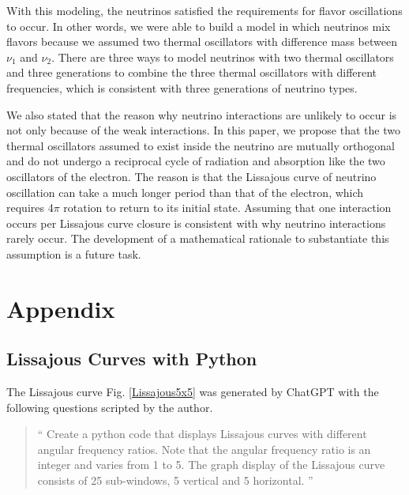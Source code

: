 \documentclass[%
 reprint,
 amsmath,amssymb,
 aps,
]{revtex4-1}
\numberwithin{equation}{section}%
\begin{document}
With this modeling, the neutrinos satisfied the requirements for flavor oscillations to occur. In other words, we were able to build a model in which neutrinos mix flavors because we assumed two thermal oscillators with difference mass between $\nu_1$ and $\nu_2$. There are three ways to model neutrinos with two thermal oscillators and three generations to combine the three thermal oscillators with different frequencies, which is consistent with three generations of neutrino types.


We also stated that the reason why neutrino interactions are unlikely to occur is not only because of the weak interactions. In this paper, we propose that the two thermal oscillators assumed to exist inside the neutrino are mutually orthogonal and do not undergo a reciprocal cycle of radiation and absorption like the two oscillators of the electron. The reason is that the Lissajous curve of neutrino oscillation can take a much longer period than that of the electron, which requires 4$\pi$ rotation to return to its initial state. Assuming that one interaction occurs per Lissajous curve closure is consistent with why neutrino interactions rarely occur. The development of a mathematical rationale to substantiate this assumption is a future task.


\section{Appendix}
\label{Appendix}

\subsection{Lissajous Curves with Python}
\label{}


The Lissajous curve Fig. \ref{Lissajous5x5} was generated by ChatGPT with the following questions scripted by the author.

    \begin{quote}
        ``
        Create a python code that displays Lissajous curves with different angular frequency ratios. Note that the angular frequency ratio is an integer and varies from 1 to 5. The graph display of the Lissajous curve consists of 25 sub-windows, 5 vertical and 5 horizontal.
        ''
    \end{quote}
\end{document}
